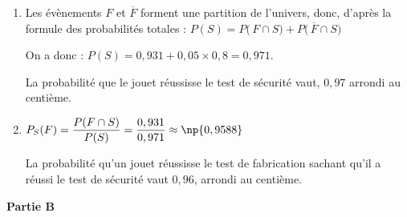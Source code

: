 \begin{enumerate}
	\item Les évènements $F$ et $\overline{F}$ forment une partition de l'univers, donc, d'après la formule des probabilités totales : \quad $P(S) = P\big(\,F\cap S\big) + P\big(\,\overline{F}\cap S\big) $

On a donc : \quad $P(S)=0,931 + 0,05\times 0,8 = 0,971$.

La probabilité que le jouet réussisse le test de sécurité vaut, $0,97$ arrondi au centième.

	\item $P_{S}(F)= \dfrac{P(F\cap S)}{P(S)} = \dfrac{0,931}{0,971}\approx \np{0,9588}$

La probabilité qu'un jouet  réussisse le test de fabrication  sachant qu'il a réussi le test de sécurité vaut $0,96$, arrondi au centième.
\end{enumerate}

\medskip

\textbf{Partie B}

\medskip

